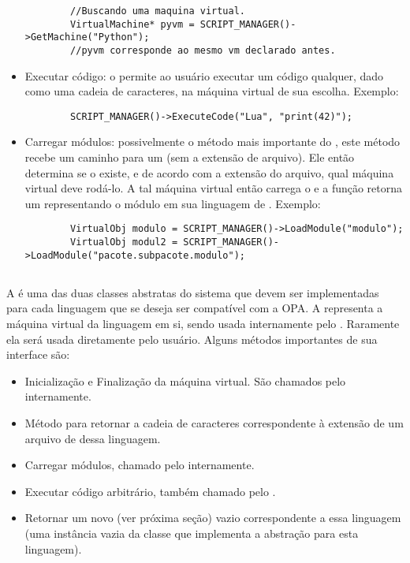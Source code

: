 \begin{itemize}
\begin{lstlisting}
        //Buscando uma maquina virtual.
        VirtualMachine* pyvm = SCRIPT_MANAGER()->GetMachine("Python");
        //pyvm corresponde ao mesmo vm declarado antes.
      \end{lstlisting}
    \item Executar código: o \SMgr{} permite ao usuário executar um código qualquer, dado como uma
      cadeia de caracteres, na máquina virtual de sua escolha. Exemplo:
      \begin{lstlisting}
        SCRIPT_MANAGER()->ExecuteCode("Lua", "print(42)");
      \end{lstlisting}
    \item Carregar módulos: possivelmente o método mais importante do \SMgr{}, este método recebe
      um caminho para um \script{} (sem a extensão de arquivo). Ele então determina se o \script{}
      existe, e de acordo com a extensão do arquivo, qual máquina virtual deve rodá-lo. A tal máquina
      virtual então carrega o \script{} e a função retorna um \VObj{} representando o módulo em
      sua linguagem de \script{}. Exemplo:
      \begin{lstlisting}
        VirtualObj modulo = SCRIPT_MANAGER()->LoadModule("modulo");
        VirtualObj modul2 = SCRIPT_MANAGER()->LoadModule("pacote.subpacote.modulo");
      \end{lstlisting}
  \end{itemize}
  
  \subsection{\VMac{}}
  \label{sec:atividades:opa:vmac}
  A \VMac{} é uma das duas classes abstratas do sistema que devem ser implementadas para
  cada linguagem que se deseja ser compatível com a OPA. A \VMac{} representa a máquina
  virtual da linguagem em si, sendo usada internamente pelo \SMgr{}. Raramente ela será
  usada diretamente pelo usuário. Alguns métodos importantes de sua interface são:
  
  \begin{itemize}
    \item Inicialização e Finalização da máquina virtual. São chamados pelo \SMgr{} internamente.
    \item Método para retornar a cadeia de caracteres correspondente à extensão de um 
      arquivo de \script{} dessa linguagem.
    \item Carregar módulos, chamado pelo \SMgr{} internamente.
    \item Executar código arbitrário, também chamado pelo \SMgr{}.
    \item Retornar um novo \VData{} (ver próxima seção) vazio correspondente a essa linguagem
      (uma instância vazia da classe que implementa a abstração \VData{} para esta linguagem).
  \end{itemize}
  
